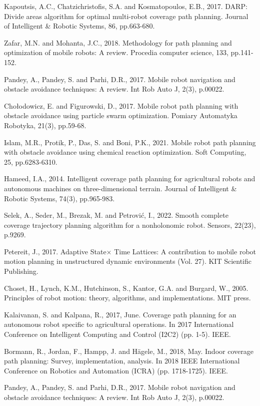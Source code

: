 \begin{thebibliography}{9}
\bibitem
Kapoutsis, A.C., Chatzichristofis, S.A. and Kosmatopoulos, E.B., 2017. DARP: Divide areas algorithm for optimal multi-robot coverage path planning. Journal of Intelligent \& Robotic Systems, 86, pp.663-680.

\bibitem
Zafar, M.N. and Mohanta, J.C., 2018. Methodology for path planning and optimization of mobile robots: A review. Procedia computer science, 133, pp.141-152.

\bibitem
Pandey, A., Pandey, S. and Parhi, D.R., 2017. Mobile robot navigation and obstacle avoidance techniques: A review. Int Rob Auto J, 2(3), p.00022.

\bibitem
Chołodowicz, E. and Figurowski, D., 2017. Mobile robot path planning with obstacle avoidance using particle swarm optimization. Pomiary Automatyka Robotyka, 21(3), pp.59-68.

\bibitem
Islam, M.R., Protik, P., Das, S. and Boni, P.K., 2021. Mobile robot path planning with obstacle avoidance using chemical reaction optimization. Soft Computing, 25, pp.6283-6310.

\bibitem
Hameed, I.A., 2014. Intelligent coverage path planning for agricultural robots and autonomous machines on three-dimensional terrain. Journal of Intelligent \& Robotic Systems, 74(3), pp.965-983.

\bibitem
Selek, A., Seder, M., Brezak, M. and Petrović, I., 2022. Smooth complete coverage trajectory planning algorithm for a nonholonomic robot. Sensors, 22(23), p.9269.

\bibitem
Petereit, J., 2017. Adaptive State× Time Lattices: A contribution to mobile robot motion planning in unstructured dynamic environments (Vol. 27). KIT Scientific Publishing.

\bibitem
Choset, H., Lynch, K.M., Hutchinson, S., Kantor, G.A. and Burgard, W., 2005. Principles of robot motion: theory, algorithms, and implementations. MIT press.

\bibitem
Kalaivanan, S. and Kalpana, R., 2017, June. Coverage path planning for an autonomous robot specific to agricultural operations. In 2017 International Conference on Intelligent Computing and Control (I2C2) (pp. 1-5). IEEE.

\bibitem
Bormann, R., Jordan, F., Hampp, J. and Hägele, M., 2018, May. Indoor coverage path planning: Survey, implementation, analysis. In 2018 IEEE International Conference on Robotics and Automation (ICRA) (pp. 1718-1725). IEEE.

\bibitem
Pandey, A., Pandey, S. and Parhi, D.R., 2017. Mobile robot navigation and obstacle avoidance techniques: A review. Int Rob Auto J, 2(3), p.00022.


\end{thebibliography}
